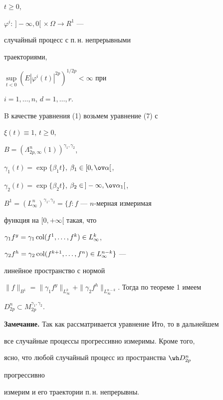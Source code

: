 $t\ge 0$, 


$\varphi^i:\,]-\infty,0[\,\times\Omega\to R^1$ ---


случайный процесс с п.\,н. непрерывными 


траекториями, 


$\sup\limits_{t<0}(E|\varphi^i(t)|^{2p})^{1/2p}<\infty$ при 


$i=1,\dotsc,n$, $d=1,\dotsc,r$. 


B качестве уравнения (1) возьмем уравнение (7) с 


$\xi(t)\equiv1$, $t\ge0$, 


$B=(\Lambda^n_{2p,\infty}(1))^{\gamma_1,\gamma_2}$, 


$\gamma_1(t)=\exp\{\beta_1t\}$, $\beta_1\in[0,\ov\alpha[$, 


$\gamma_2(t)=\exp\{\beta_2t\}$, $\beta_2\in\,]-\infty,\ov\alpha_1[$, 


$B^1=(L^n_\infty)^{\gamma_1,\gamma_2}=\{f:f$ --- $n$-мерная измеримая 


функция на $[0,+\infty[$ такая, что 


$\gamma_1f^y=\gamma_1\operatorname{col}(f^1,\dotsc,f^k)\in L^k_\infty$, 


$\gamma_2f^h=\gamma_2\operatorname{col}(f^{k+1},\dotsc,f^n)\in L^{n-k}_\infty\}$ --- 


линейное пространство с нормой 


$\|f\|_{B^1}=\|\gamma_1f^y\|_{L^k_\infty}+ 


\|\gamma_2f^h\|_{L^{n-k}_\infty}$. Тогда по теореме 1 имеем 


$D^n_{2p}\subset M^{\gamma_1,\gamma_2}_{2p}$. 


\medskip 


 


{\bf Замечание.} Так как рассматривается уравнение Ито, то в дальнейшем 


все случайные процессы прогрессивно измеримы. Кроме того, 


ясно, что любой случайный процесс из пространства $\wh D^n_{2p}$ 


прогрессивно 


измерим и его траектории п.\,н. непрерывны. 


 


